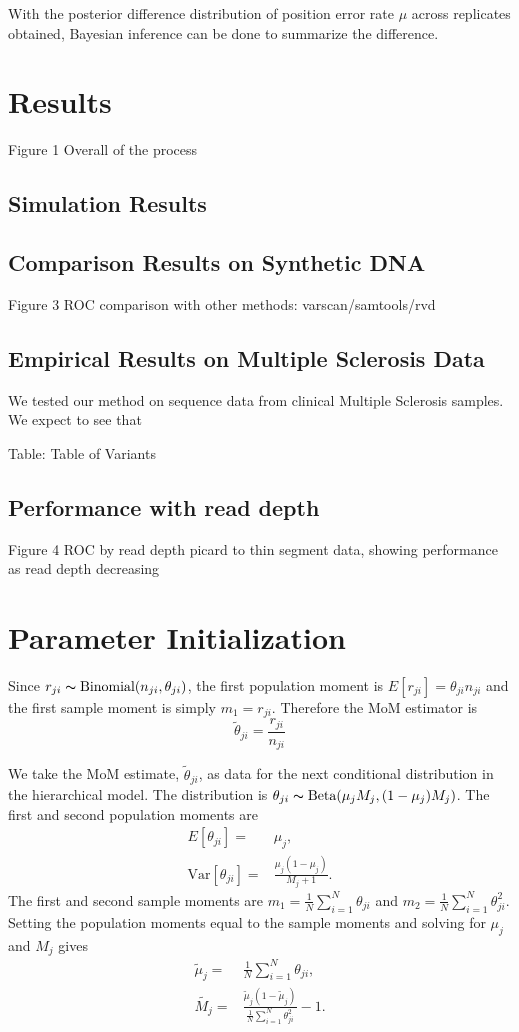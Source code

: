 \documentclass[11pt,reqno]{amsart}
\begin{document}
With the posterior difference distribution of position error rate $\mu$ across replicates obtained, Bayesian inference can be done to summarize the difference. 


\section{Results}
Figure 1 Overall of the process
\subsection{Simulation Results}
\subsection{Comparison Results on Synthetic DNA}
Figure 3 ROC comparison with other methods: varscan/samtools/rvd
\subsection{Empirical Results on Multiple Sclerosis Data}
We tested our method on sequence data from clinical Multiple Sclerosis samples. We expect to see that 

Table: Table of Variants
\subsection{Performance with read depth}
Figure 4 ROC by read depth
picard to thin segment data, showing performance as read depth decreasing

\appendix
\section{Parameter Initialization}\label{sec:appendix_mom}
Since $r_{ji} \thicksim \text{Binomial}(n_{ji}, \theta_{ji})$, the first population moment is  $E[r_{ji}] = \theta_{ji} n_{ji}$ and the first sample moment is simply $m_1 = r_{ji}$. Therefore the MoM estimator is 
\begin{equation}
	\tilde{\theta}_{ji} = \frac{r_{ji}} {n_{ji}}
\end{equation}

We take the MoM estimate, $\tilde{\theta}_{ji}$, as data for the next conditional distribution in the hierarchical model. The distribution is $\theta_{ji} \thicksim \text{Beta}(\mu_jM_j, (1-\mu_j)M_j)$. The first and second population moments are
\begin{eqnarray}
	E[\theta_{ji}] =& \mu_j,\\
	\text{Var}[\theta_{ji}] =& \frac{\mu_j(1-\mu_j)} { M_j + 1 }.
\end{eqnarray}
The first and second sample moments are $m_1 = \frac{1}{N}\sum_{i=1}^N \theta_{ji}$ and $m_2 = \frac{1}{N}\sum_{i=1}^N \theta_{ji}^2$. Setting the population moments equal to the sample moments and solving for $\mu_j$ and $M_j$ gives
\begin{eqnarray}
	\tilde{\mu}_j =& \frac{1}{N} \sum_{i=1}^N \theta_{ji}, \\
	\tilde{M_j} =& \frac{ \tilde{\mu}_j (1 - \tilde{\mu}_j ) } { \frac{1}{N} \sum_{i=1}^N \theta_{ji}^2 } -1.
\end{eqnarray}
\end{document}
